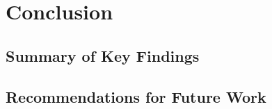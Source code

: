 
\chapter{Conclusion\label{chap:conclusion}}

\todo{}

\section{Summary of Key Findings}

\todo{}

\section{Recommendations for Future Work}

\todo{}
